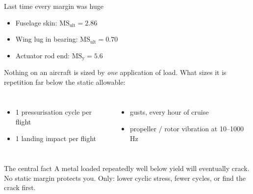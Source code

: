\documentclass[aspectratio=169,10pt]{beamer}
\begin{document}
\begin{frame}{Last time every margin was huge}
\begin{itemize}
  \item Fuselage skin: $\mathrm{MS}_{\text{ult}}=2.86$
  \item Wing lug in bearing: $\mathrm{MS}_{\text{ult}}=0.70$
  \item Actuator rod end: $\mathrm{MS}_{\text{y}}=5.6$
\end{itemize}
\vspace{4pt}
Nothing on an aircraft is sized by \emph{one} application of load. What sizes it is \alert{repetition} far below the static allowable:
\begin{columns}[T]
\begin{itemize}
  \item 1 pressurisation cycle per flight
  \item 1 landing impact per flight
\end{itemize}
\begin{itemize}
  \item gusts, every hour of cruise
  \item propeller / rotor vibration at 10--1000\,Hz
\end{itemize}
\end{columns}
\begin{alertblock}{The central fact}
A metal loaded repeatedly well below yield will eventually crack. No static margin protects you. Only: lower cyclic stress, fewer cycles, or find the crack first.
\end{alertblock}
\end{frame}
\end{document}
